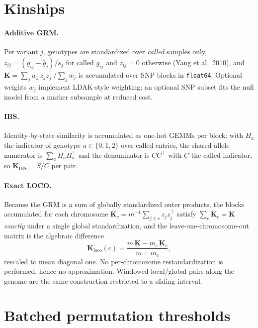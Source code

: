 \documentclass[11pt]{article}
\newcommand{\K}{\mathbf{K}}
\begin{document}
\section{Kinships}

\paragraph{Additive GRM.} Per variant $j$, genotypes are standardized
over \emph{called} samples only,
$z_{ij} = (g_{ij} - \bar g_j)/s_j$ for called $g_{ij}$ and $z_{ij}=0$
otherwise (Yang et al.\ 2010), and
$\K = \sum_j w_j\, z_j z_j^\top / \sum_j w_j$ is accumulated over SNP
blocks in \texttt{float64}. Optional weights $w_j$ implement LDAK-style
weighting; an optional SNP subset fits the null model from a marker
subsample at reduced cost.

\paragraph{IBS.} Identity-by-state similarity is accumulated as one-hot
GEMMs per block: with $H_a$ the indicator of genotype $a \in \{0,1,2\}$
over called entries, the shared-allele numerator is
$\sum_a H_a H_a^\top$ and the denominator is $C C^\top$ with $C$ the
called-indicator, so $\K_{\mathrm{IBS}} = S/C$ per pair.

\paragraph{Exact LOCO.} Because the GRM is a sum of globally
standardized outer products, the blocks accumulated for each
chromosome $\K_c = m^{-1}\sum_{j \in c} z_j z_j^\top$ satisfy $\sum_c \K_c = \K$
\emph{exactly} under a single global standardization, and the
leave-one-chromosome-out matrix is the algebraic difference
\begin{equation}
  \K_{\mathrm{loco}}(c) = \frac{m\,\K - m_c\,\K_c}{m - m_c},
\end{equation}
rescaled to mean diagonal one. No per-chromosome restandardization is
performed, hence no approximation. Windowed local/global pairs along
the genome are the same construction restricted to a sliding interval.

\section{Batched permutation thresholds}
\end{document}
